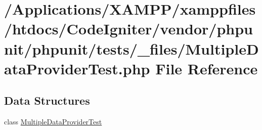 \hypertarget{_multiple_data_provider_test_8php}{}\section{/\+Applications/\+X\+A\+M\+P\+P/xamppfiles/htdocs/\+Code\+Igniter/vendor/phpunit/phpunit/tests/\+\_\+files/\+Multiple\+Data\+Provider\+Test.php File Reference}
\label{_multiple_data_provider_test_8php}
\subsection*{Data Structures}
\begin{DoxyCompactItemize}
\item 
class \mbox{\hyperlink{class_multiple_data_provider_test}{Multiple\+Data\+Provider\+Test}}
\end{DoxyCompactItemize}
